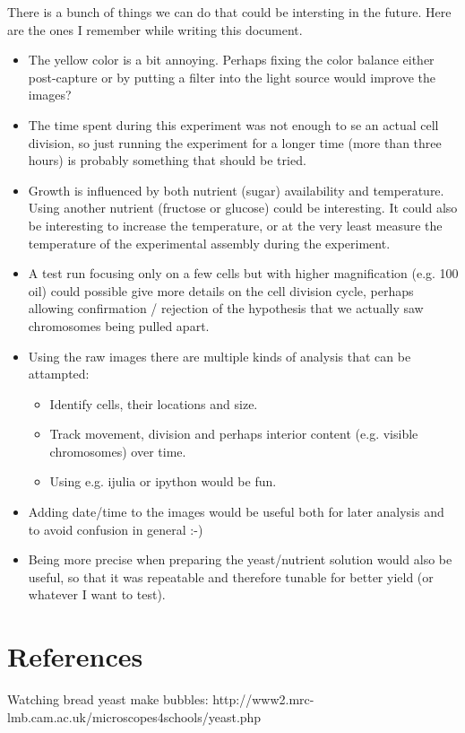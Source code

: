 \documentclass[12pt, a4paper]{article}
\begin{document}
There is a bunch of things we can do that could be intersting in the
future. Here are the ones I remember while writing this document.

\begin{itemize}
\item The yellow color is a bit annoying.  Perhaps fixing the color
  balance either post-capture or by putting a filter into the
  light source would improve the images?
\item The time spent during this experiment was not enough to 
  se an actual cell division, so just running the experiment for 
  a longer time (more than three hours) is probably something that
 should be tried.
\item Growth is influenced by both nutrient (sugar) availability and
  temperature.   Using another nutrient (fructose or glucose) could
  be interesting.  It could also be interesting to increase the
  temperature, or at the very least measure the temperature of the
  experimental assembly during the experiment.
\item A test run focusing only on a few cells but with higher
  magnification (e.g. 100 oil) could possible give more details on the cell division
  cycle, perhaps allowing confirmation / rejection of the hypothesis
  that we actually saw chromosomes being pulled apart.
\item Using the raw images there are multiple kinds of analysis that
  can be attampted:
\begin{itemize}
 \item Identify cells, their locations and size.
 \item Track movement, division and perhaps interior content
   (e.g. visible chromosomes) over time.
 \item Using e.g. ijulia or ipython would be fun.
\end{itemize}
\item Adding date/time to the images would be useful both for later
  analysis and to avoid confusion in general :-)
\item Being more precise when preparing the yeast/nutrient solution
  would also be useful, so that it was repeatable and therefore
  tunable for better yield (or whatever I want to test).
\end{itemize}




\section{References}


Watching bread yeast make bubbles: 
http://www2.mrc-lmb.cam.ac.uk/microscopes4schools/yeast.php
\end{document}
